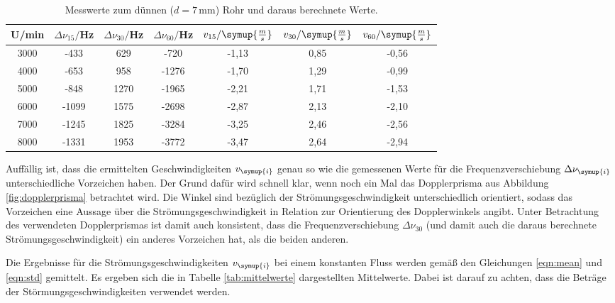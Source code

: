 \begin{table}[htp]
	\begin{center}
    \caption{Messwerte zum dünnen ($d=7\,$mm) Rohr und daraus berechnete Werte.}
    \label{tab:dünn}
		\begin{tabular}{ccccccc}
		\toprule
			{U/min} & {$\Delta \nu_{15}/$Hz} & {$\Delta \nu_{30}/$Hz} & {$\Delta \nu_{60}/$Hz} &
      {$v_{15}/\symup{\frac{m}{s}}$} & {$v_{30}/\symup{\frac{m}{s}}$} & {$v_{60}/\symup{\frac{m}{s}}$}\\
			\midrule
			3000 & -433 & 629 & -720 & -1,13 & 0,85 & -0,56\\
			4000 & -653 & 958 & -1276 & -1,70 & 1,29 & -0,99\\
			5000 & -848 & 1270 & -1965 & -2,21 & 1,71 & -1,53\\
			6000 & -1099 & 1575 & -2698 & -2,87 & 2,13 & -2,10\\
			7000 & -1245 & 1825 & -3284 & -3,25 & 2,46 & -2,56\\
			8000 & -1331 & 1953 & -3772 & -3,47 & 2,64 & -2,94\\
		\bottomrule
		\end{tabular}
	\end{center}
\end{table}
Auffällig ist, dass die ermittelten Geschwindigkeiten $v_{\symup{i}}$ genau so wie die gemessenen
Werte für die Frequenzverschiebung $\Delta \nu_{\symup{i}}$ unterschiedliche Vorzeichen haben.
Der Grund dafür wird schnell klar, wenn noch ein Mal das Dopplerprisma aus Abbildung
\ref{fig:dopplerprisma} betrachtet wird. Die Winkel sind bezüglich der Strömungsgeschwindigkeit
unterschiedlich orientiert, sodass das Vorzeichen eine Aussage über die Strömungsgeschwindigkeit
in Relation zur Orientierung des Dopplerwinkels angibt. Unter Betrachtung des verwendeten
Dopplerprismas ist damit auch konsistent, dass die Frequenzverschiebung $\Delta \nu_{30}$
(und damit auch die daraus berechnete Strömungsgeschwindigkeit) ein anderes Vorzeichen hat,
als die beiden anderen.

Die Ergebnisse für die Strömungsgeschwindigkeiten $v_{\symup{i}}$ bei einem
konstanten Fluss werden gemäß den Gleichungen \eqref{eqn:mean} und \eqref{eqn:std}
gemittelt. Es ergeben sich die in Tabelle \ref{tab:mittelwerte} dargestellten Mittelwerte.
Dabei ist darauf zu achten, dass die Beträge der Störmungsgeschwindigkeiten verwendet werden.



